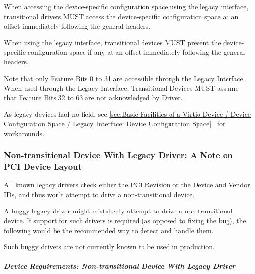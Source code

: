 When accessing the device-specific configuration space
using the legacy interface, transitional
drivers MUST access the device-specific configuration space
at an offset immediately following the general headers.

When using the legacy interface, transitional
devices MUST present the device-specific configuration space
if any at an offset immediately following the general headers.

Note that only Feature Bits 0 to 31 are accessible through the
Legacy Interface. When used through the Legacy Interface,
Transitional Devices MUST assume that Feature Bits 32 to 63
are not acknowledged by Driver.

As legacy devices had no  field,
see \ref{sec:Basic Facilities of a Virtio Device / Device
Configuration Space / Legacy Interface: Device Configuration
Space}~ for workarounds.

\subsubsection{Non-transitional Device With Legacy Driver: A Note
on PCI Device Layout}\label{sec:Virtio Transport Options / Virtio
Over PCI Bus / PCI Device Layout / Non-transitional Device With
Legacy Driver: A Note on PCI Device Layout}

All known legacy drivers check either the PCI Revision or the
Device and Vendor IDs, and thus won't attempt to drive a
non-transitional device.

A buggy legacy driver might mistakenly attempt to drive a
non-transitional device. If support for such drivers is required
(as opposed to fixing the bug), the following would be the
recommended way to detect and handle them.
\begin{note}
Such buggy drivers are not currently known to be used in
production.
\end{note}

\subparagraph{Device Requirements: Non-transitional Device With Legacy Driver}
\label{drivernormative:Virtio Transport Options / Virtio Over PCI
Bus / PCI-specific Initialization And Device Operation /
Device Initialization / Non-transitional Device With Legacy
Driver}
\label{devicenormative:Virtio Transport Options / Virtio Over PCI
Bus / PCI-specific Initialization And Device Operation /
Device Initialization / Non-transitional Device With Legacy
Driver}

